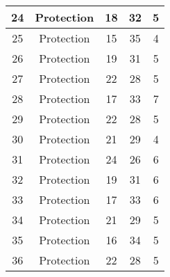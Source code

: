 \documentclass[results.tex]{subfiles}
\begin{document}
\begin{center}
\begin{tabular}{| c || c | c | c | c |}
            \hline
            24                      & Protection                   & 18                     & 32                      & 5                    \\
            \hline
            25                      & Protection                   & 15                     & 35                      & 4                    \\
            \hline
            26                      & Protection                   & 19                     & 31                      & 5                    \\
            \hline
            27                      & Protection                   & 22                     & 28                      & 5                    \\
            \hline
            28                      & Protection                   & 17                     & 33                      & 7                    \\
            \hline
            29                      & Protection                   & 22                     & 28                      & 5                    \\
            \hline
            30                      & Protection                   & 21                     & 29                      & 4                    \\
            \hline
            31                      & Protection                   & 24                     & 26                      & 6                    \\
            \hline
            32                      & Protection                   & 19                     & 31                      & 6                    \\
            \hline
            33                      & Protection                   & 17                     & 33                      & 6                    \\
            \hline
            34                      & Protection                   & 21                     & 29                      & 5                    \\
            \hline
            35                      & Protection                   & 16                     & 34                      & 5                    \\
            \hline
            36                      & Protection                   & 22                     & 28                      & 5                    \\

\end{tabular}
\end{center}
\end{document}
